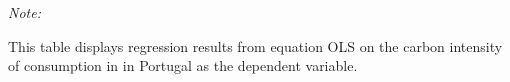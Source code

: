 \begin{table}[htbp!]
\begin{adjustbox}{width = 1\textwidth, max height = 0.95\textheight, center}
\begin{threeparttable}[b]
         \begin{tablenotes}\item \medskip \textit{Note:}
            \item This table displays regression results from equation OLS on the carbon intensity of consumption in  in Portugal as the dependent variable. 
         \end{tablenotes}
      \end{threeparttable}
   \end{adjustbox}
\end{table}


